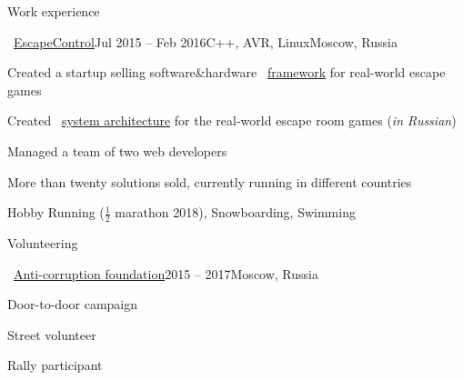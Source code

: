 \documentclass{resume} %
\begin{document}
\begin{rSection}{Work experience}

\begin{rSubsection}{\faExternalLink~\href{http://escapecontrol.ru}{EscapeControl}}{Jul 2015 -- Feb 2016}{C++, AVR, Linux}{Moscow, Russia}
	\item Created a startup selling software\&hardware \faExternalLink~\href{http://demo:demo@ec3.pagekite.escapecontrol.ru}{framework} for real-world escape games
	\item Created \faExternalLink~\href{http://habr.ru/p/258585/}{system architecture} for the real-world escape room games ({\em in Russian})
	\item Managed a team of two web developers
	\item More than twenty solutions sold, currently running in different countries
\end{rSubsection}


		
\end{rSection}

\begin{rSection}{Hobby}
	Running ($\frac{1}{2}$ marathon 2018), Snowboarding, Swimming
\end{rSection}

\begin{rSection}{Volunteering}
	\begin{rSubsection}{\faExternalLink~\href{https://fbk.info/english/about/}{Anti-corruption foundation}}{2015 -- 2017}{Moscow, Russia}{}
		\item Door-to-door campaign
		\item Street volunteer
		\item Rally participant
	\end{rSubsection}
\end{rSection}
\end{document}
